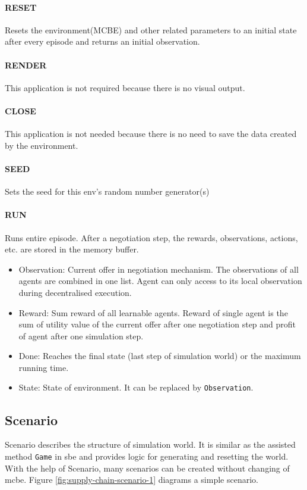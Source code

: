 \paragraph{RESET} Resets the environment(MCBE) and other related parameters to an initial state after every episode and returns an initial observation.
\paragraph{RENDER} This application is not required because there is no visual output.
\paragraph{CLOSE} This application is not needed because there is no need to save the data created by
the environment.
\paragraph{SEED} Sets the seed for this env’s random number generator(s)
\paragraph{RUN} Runs entire episode. After a negotiation step, the rewards, observations, actions, etc. are stored in the memory buffer. 
\begin{itemize}
	\item Observation: Current offer in negotiation mechanism. The observations of all agents are combined in one list. Agent can only access to its local observation during decentralised execution.
	\item Reward: Sum reward of all learnable agents. Reward of single agent is the sum of utility value of the current offer after one negotiation step and profit of agent after one simulation step.
	\item Done: Reaches the final state (last step of simulation world) or the maximum running time.
	\item State: State of environment. It can be replaced by \texttt{Observation}.
\end{itemize}

\subsection{Scenario} \label{scenario}
Scenario describes the structure of simulation world. It is similar as the assisted method \texttt{Game} in \gls{sbe} and provides logic for generating and resetting the world. With the help of Scenario, many scenarios can be created without changing of \gls{mcbe}. Figure \ref{fig:supply-chain-scenario-1} diagrams a simple scenario.


